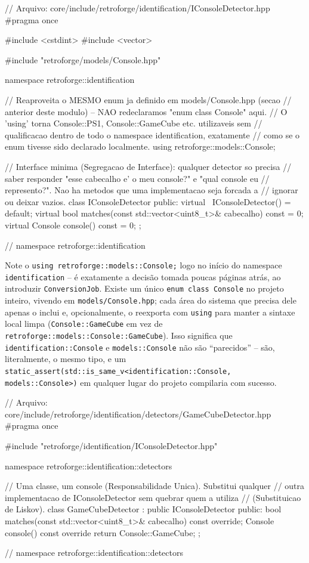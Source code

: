 \begin{CaixaCodigo}
// Arquivo: core/include/retroforge/identification/IConsoleDetector.hpp
#pragma once

#include <cstdint>
#include <vector>

#include "retroforge/models/Console.hpp"

namespace retroforge::identification {

// Reaproveita o MESMO enum ja definido em models/Console.hpp (secao
// anterior deste modulo) -- NAO redeclaramos "enum class Console" aqui.
// O 'using' torna Console::PS1, Console::GameCube etc. utilizaveis sem
// qualificacao dentro de todo o namespace identification, exatamente
// como se o enum tivesse sido declarado localmente.
using retroforge::models::Console;

// Interface minima (Segregacao de Interface): qualquer detector so precisa
// saber responder "esse cabecalho e' o meu console?" e "qual console eu
// represento?". Nao ha metodos que uma implementacao seja forcada a
// ignorar ou deixar vazios.
class IConsoleDetector {
public:
    virtual ~IConsoleDetector() = default;
    virtual bool matches(const std::vector<uint8_t>& cabecalho) const = 0;
    virtual Console console() const = 0;
};

} // namespace retroforge::identification
\end{CaixaCodigo}

\begin{CaixaInfo}
Note o \texttt{using retroforge::models::Console;} logo no início do namespace \texttt{identification} -- é exatamente a decisão tomada poucas páginas atrás, ao introduzir \texttt{ConversionJob}. Existe um único \texttt{enum class Console} no projeto inteiro, vivendo em \texttt{models/Console.hpp}; cada área do sistema que precisa dele apenas o inclui e, opcionalmente, o reexporta com \texttt{using} para manter a sintaxe local limpa (\texttt{Console::GameCube} em vez de \texttt{retroforge::models::Console::GameCube}). Isso significa que \texttt{identification::Console} e \texttt{models::Console} não são ``parecidos'' -- são, literalmente, o mesmo tipo, e um \texttt{static\_assert(std::is\_same\_v<identification::Console, models::Console>)} em qualquer lugar do projeto compilaria com sucesso.
\end{CaixaInfo}

\begin{CaixaCodigo}
// Arquivo: core/include/retroforge/identification/detectors/GameCubeDetector.hpp
#pragma once

#include "retroforge/identification/IConsoleDetector.hpp"

namespace retroforge::identification::detectors {

// Uma classe, um console (Responsabilidade Unica). Substitui qualquer
// outra implementacao de IConsoleDetector sem quebrar quem a utiliza
// (Substituicao de Liskov).
class GameCubeDetector : public IConsoleDetector {
public:
    bool matches(const std::vector<uint8_t>& cabecalho) const override;
    Console console() const override { return Console::GameCube; }
};

} // namespace retroforge::identification::detectors
\end{CaixaCodigo}

